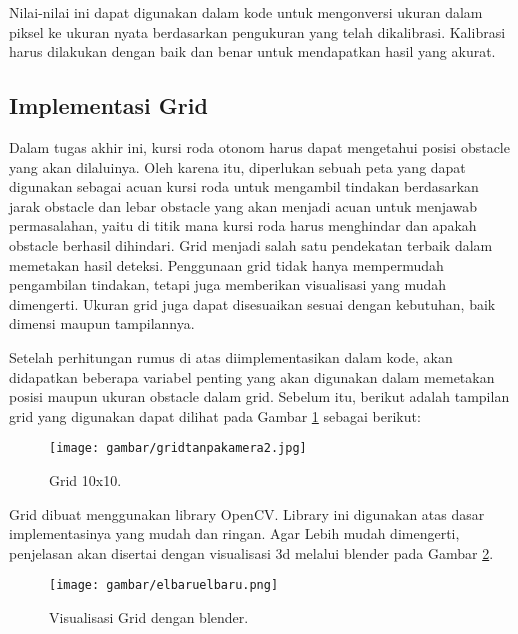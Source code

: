 Nilai-nilai ini dapat digunakan dalam kode untuk mengonversi ukuran dalam piksel ke ukuran nyata berdasarkan pengukuran yang telah dikalibrasi. Kalibrasi harus dilakukan dengan baik dan benar untuk mendapatkan hasil yang akurat.

\subsection{Implementasi Grid}
Dalam tugas akhir ini, kursi roda otonom harus dapat mengetahui posisi obstacle yang akan dilaluinya. Oleh karena itu, diperlukan sebuah peta yang dapat digunakan sebagai acuan kursi roda untuk mengambil tindakan berdasarkan jarak obstacle dan lebar obstacle yang akan menjadi acuan untuk menjawab permasalahan, yaitu di titik mana kursi roda harus menghindar dan apakah obstacle berhasil dihindari. Grid menjadi salah satu pendekatan terbaik dalam memetakan hasil deteksi. Penggunaan grid tidak hanya mempermudah pengambilan tindakan, tetapi juga memberikan visualisasi yang mudah dimengerti. Ukuran grid juga dapat disesuaikan sesuai dengan kebutuhan, baik dimensi maupun tampilannya.

Setelah perhitungan rumus di atas diimplementasikan dalam kode, akan didapatkan beberapa variabel penting yang akan digunakan dalam memetakan posisi maupun ukuran obstacle dalam grid. Sebelum itu, berikut adalah tampilan grid yang digunakan dapat dilihat pada Gambar \ref{fig:Grid10x10} sebagai berikut:

\begin{figure}[H]
  \centering
  \texttt{[image: gambar/gridtanpakamera2.jpg]}
  \caption{Grid 10x10.}
  \label{fig:Grid10x10}
\end{figure}

Grid dibuat menggunakan library OpenCV. Library ini digunakan atas dasar implementasinya yang mudah dan ringan. Agar Lebih mudah dimengerti, penjelasan akan disertai dengan visualisasi 3d melalui blender pada Gambar \ref{fig:gridxblendxmanusiatengah}. 

\begin{figure}[H]
  \centering
  \texttt{[image: gambar/elbaruelbaru.png]}
  \caption{Visualisasi Grid dengan blender.}
  \label{fig:gridxblendxmanusiatengah}
\end{figure}


